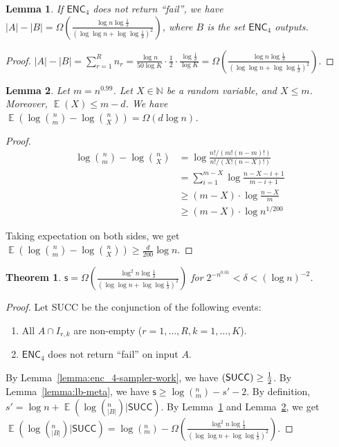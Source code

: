 \documentclass[10pt]{article}
\DeclareMathOperator*{\E}{\mathbb{E}}
\let\Pr\relax
\DeclareMathOperator*{\Pr}{\mathbb{P}}
\newtheorem{theorem}{Theorem}
\newtheorem{lemma}{Lemma}
\newcommand{\success}{\textsf{SUCC}\xspace}
\newcommand{\enc}{\textsf{ENC}\xspace}
\newcommand{\s}{\textsf{s}\xspace}
\begin{document}
\begin{lemma} \label{lemma:words-saving}
  If $\enc_4$ does not return ``fail'', we have $|A|-|B|=\Omega(\frac{\log n \log \frac{1}{\delta}}{(\log\log n + \log\log \frac{1}{\delta})^2})$, where $B$ is the set $\enc_4$ outputs.
\end{lemma}

\begin{proof}
  $|A|-|B|=\sum_{r=1}^{R}{n_r}= \frac{\log n}{50 \log K} \cdot \frac{1}{2}\cdot \frac{\log \frac{1}{\delta}}{\log K}
  = \Omega(\frac{\log n \log \frac{1}{\delta}}{(\log\log n + \log\log \frac{1}{\delta})^2})$.
\end{proof}


\begin{lemma} \label{lemma:bits-saving}
  Let $m=n^{0.99}$. Let $X\in \mathbb{N}$ be a random variable, and $X\le m$. Moreover, $\E(X)\le m-d$. We have $\E(\log {n \choose m}-\log {n \choose X})=\Omega(d \log n)$.
\end{lemma}

\begin{proof}
  \begin{align*}
    \log {n \choose m}-\log {n \choose X}
    &=   \log \frac{n!/(m!(n-m)!)}{n!/(X!(n-X)!)} \\
    &=   \sum_{i=1}^{m-X}\log \frac{n-X-i+1}{m-i+1} \\
    &\ge (m-X)\cdot \log \frac{n-X}{m} \\
    &\ge (m-X)\cdot \log n^{1/200}
  \end{align*}
  
  Taking expectation on both sides, we get $\E(\log {n \choose m}-\log {n \choose X})\ge \frac{d}{200} \log n$. 
\end{proof}

\begin{theorem}
  $\s = \Omega(\frac{\log^2 n\log{\frac{1}{\delta}}}{(\log\log n+\log\log \frac{1}{\delta})^2})$ for $2^{-n^{0.01}}<\delta<(\log n)^{-2}$.
\end{theorem}

\begin{proof}
  Let \success be the conjunction of the following events:
  \begin{enumerate}
    \item All $A \cap I_{r,k}$ are non-empty ($r=1,\ldots, R, k=1,\ldots, K$).
    \item $\enc_4$ does not return ``fail'' on input $A$.
  \end{enumerate}
  By Lemma~\ref{lemma:enc_4-sampler-work}, we have $\Pr(\success)\ge \frac{1}{2}$. By Lemma~\ref{lemma:lb-meta}, we have $\s\ge \log (^n_m) - s' -2$. By definition, $s'=\log n + \E(\log (^n_{|B|})|\success)$. By Lemma~\ref{lemma:words-saving} and Lemma~\ref{lemma:bits-saving}, we get $\E(\log (^n_{|B|})|\success)=\log (^n_m)-\Omega(\frac{\log^2 n\log{\frac{1}{\delta}}}{(\log\log n+\log\log \frac{1}{\delta})^2})$. 
\end{proof}
\end{document}
